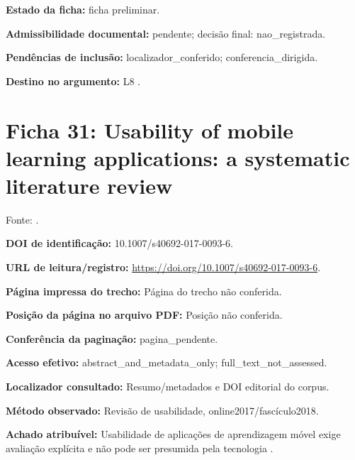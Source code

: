 \noindent\textbf{Estado da ficha:} ficha preliminar.\par\medskip

\noindent\textbf{Admissibilidade documental:} pendente; decisão final: nao\_registrada.\par\medskip

\noindent\textbf{Pendências de inclusão:} localizador\_conferido; conferencia\_dirigida.\par\medskip

\noindent\textbf{Destino no argumento:} L8 .

\clearpage\section*{Ficha 31: Usability of mobile learning applications: a systematic literature review}

Fonte: \citet{kumar2017}.

\noindent\textbf{DOI de identificação:} 10.1007/s40692-017-0093-6.\par\medskip

\noindent\textbf{URL de leitura/registro:} \url{https://doi.org/10.1007/s40692-017-0093-6}.\par\medskip

\noindent\textbf{Página impressa do trecho:} Página do trecho não conferida.\par\medskip

\noindent\textbf{Posição da página no arquivo PDF:} Posição não conferida.\par\medskip

\noindent\textbf{Conferência da paginação:} pagina\_pendente.\par\medskip

\noindent\textbf{Acesso efetivo:} abstract\_and\_metadata\_only; full\_text\_not\_assessed.\par\medskip

\noindent\textbf{Localizador consultado:} Resumo/metadados e DOI editorial do corpus.\par\medskip

\noindent\textbf{Método observado:} Revisão de usabilidade, online2017/fascículo2018.\par\medskip

\noindent\textbf{Achado atribuível:} Usabilidade de aplicações de aprendizagem móvel exige avaliação explícita e não pode ser presumida pela tecnologia \citep{kumar2017}.\par\medskip

